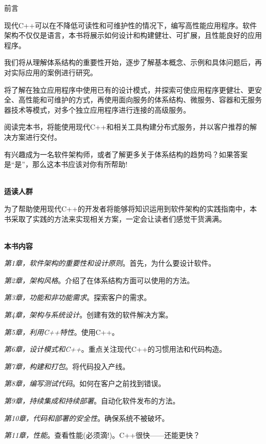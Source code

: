 \begin{flushright}
	 前言
\end{flushright}

现代C++可以在不降低可读性和可维护性的情况下，编写高性能应用程序。软件架构不仅仅是语言，本书将展示如何设计和构建健壮、可扩展，且性能良好的应用程序。

我们将从理解体系结构的重要性开始，逐步了解基本概念、示例和具体问题后，再对实际应用的案例进行研究。

将了解在独立应用程序中使用已有的设计模式，并探索可使应用程序更健壮、更安全、高性能和可维护的方式，再使用面向服务的体系结构、微服务、容器和无服务器技术等模式，对多个独立应用程序进行连接的高级服务。

阅读完本书，将能使用现代C++和相关工具构建分布式服务，并以客户推荐的解决方案进行交付。

有兴趣成为一名软件架构师，或者了解更多关于体系结构的趋势吗？如果答案是“是”，那么这本书应该对你有所帮助!


\hspace*{\fill} \\ %
\noindent\textbf{适读人群}

为了帮助使用现代C++的开发者将能够将知识运用到软件架构的实践指南中，本书采取了实践的方法来实现相关方案，一定会让读者们感觉干货满满。

\hspace*{\fill} \\ %
\textbf{本书内容}

\textit{第1章，软件架构的重要性和设计原则}。首先，为什么要设计软件。

\textit{第2章，架构风格}。介绍了在体系结构方面可以使用的方法。

\textit{第3章，功能和非功能需求}。探索客户的需求。

\textit{第4章，架构与系统设计}。创建有效的软件解决方案。

\textit{第5章，利用C++特性}。使用C++。

\textit{第6章，设计模式和C++}。重点关注现代C++的习惯用法和代码构造。

\textit{第7章，构建和打包}。将代码投入产线。

\textit{第8章，编写测试代码}。如何在客户之前找到错误。

\textit{第9章，持续集成和持续部署}。自动化软件发布的方法。

\textit{第10章，代码和部署的安全性}。确保系统不被破坏。

\textit{第11章，性能}。查看性能(必须滴!)。C++很快——还能更快？

